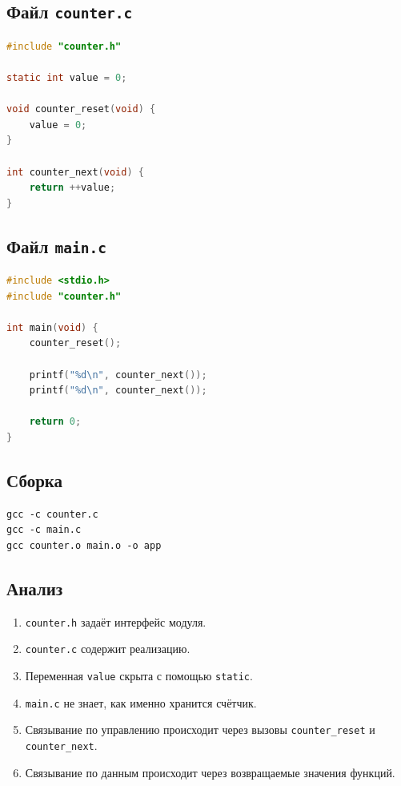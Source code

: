 \documentclass[12pt,a4paper]{article}
\begin{document}
\subsection*{Файл \texttt{counter.c}}

\begin{lstlisting}[language=C]
#include "counter.h"

static int value = 0;

void counter_reset(void) {
    value = 0;
}

int counter_next(void) {
    return ++value;
}
\end{lstlisting}

\subsection*{Файл \texttt{main.c}}

\begin{lstlisting}[language=C]
#include <stdio.h>
#include "counter.h"

int main(void) {
    counter_reset();

    printf("%d\n", counter_next());
    printf("%d\n", counter_next());

    return 0;
}
\end{lstlisting}

\subsection*{Сборка}

\begin{lstlisting}
gcc -c counter.c
gcc -c main.c
gcc counter.o main.o -o app
\end{lstlisting}

\subsection*{Анализ}

\begin{enumerate}
  \item \texttt{counter.h} задаёт интерфейс модуля.
  \item \texttt{counter.c} содержит реализацию.
  \item Переменная \texttt{value} скрыта с помощью \texttt{static}.
  \item \texttt{main.c} не знает, как именно хранится счётчик.
  \item Связывание по управлению происходит через вызовы \texttt{counter\_reset} и \texttt{counter\_next}.
  \item Связывание по данным происходит через возвращаемые значения функций.
\end{enumerate}
\end{document}
